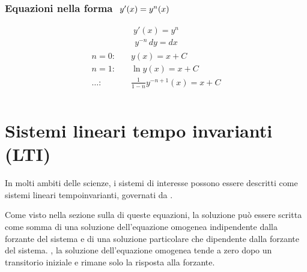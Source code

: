 \documentclass[letterpaper,10pt,italian]{jupyterBook}
\begin{document}
\subsubsection*{Equazioni nella forma \protect\(\ y'(x) = y^n(x)\protect\)}
\begin{equation*}
\begin{split}y'(x) = y^n\end{split}
\end{equation*}\begin{equation*}
\begin{split}y^{-n} \, dy = dx\end{split}
\end{equation*}\begin{equation*}
\begin{split}\begin{aligned}
 n = 0: & \quad  y(x) = x + C \\
 n = 1: & \quad  \ln y(x) = x + C \\
 \dots: & \quad  \frac{1}{1-n} y^{-n+1}(x) = x + C  \\
\end{aligned}\end{split}
\end{equation*}
\sphinxstepscope


\section{Sistemi lineari tempo invarianti (LTI)}
\label{\detokenize{ch/ode-lti:sistemi-lineari-tempo-invarianti-lti}}\label{\detokenize{ch/ode-lti:ode-lti}}\label{\detokenize{ch/ode-lti::doc}}
\sphinxAtStartPar
In molti ambiti delle scienze, i sistemi di interesse possono essere descritti come sistemi lineari tempo\sphinxhyphen{}invarianti, governati da {\hyperref[\detokenize{ch/ode:ode-hs-types-linear-const}]{}}.

\sphinxAtStartPar
Come visto nella sezione sulla {\hyperref[\detokenize{ch/ode:ode-hs-types-linear-const-sol}]{}} di queste equazioni, la soluzione può essere scritta come somma di una soluzione dell’equazione omogenea indipendente dalla forzante del sistema e di una soluzione particolare che dipendente dalla forzante del sistema. , la soluzione dell’equazione omogenea tende a zero dopo un transitorio iniziale e rimane solo la risposta alla forzante.
\end{document}
